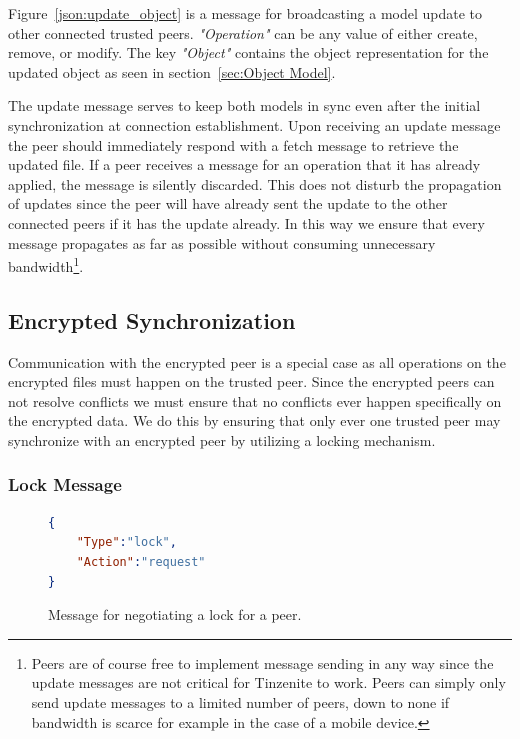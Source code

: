 Figure~\ref{json:update_object} is a message for broadcasting a model update to other connected trusted peers.
\textit{"Operation"} can be any value of either create, remove, or modify.
The key \textit{"Object"} contains the object representation for the updated object as seen in section~\ref{sec:Object Model}.

The update message serves to keep both models in sync even after the initial synchronization at connection establishment.
Upon receiving an update message the peer should immediately respond with a fetch message to retrieve the updated file.
If a peer receives a message for an operation that it has already applied, the message is silently discarded.
This does not disturb the propagation of updates since the peer will have already sent the update to the other connected peers if it has the update already.
In this way we ensure that every message propagates as far as possible without consuming unnecessary bandwidth\footnote{Peers are of course free to implement message sending in any way since the update messages are not critical for Tinzenite to work. Peers can simply only send update messages to a limited number of peers, down to none if bandwidth is scarce for example in the case of a mobile device.}.

\subsection{Encrypted Synchronization}
\label{sub:Encrypted Synchronization}

Communication with the encrypted peer is a special case as all operations on the encrypted files must happen on the trusted peer.
Since the encrypted peers can not resolve conflicts we must ensure that no conflicts ever happen specifically on the encrypted data.
We do this by ensuring that only ever one trusted peer may synchronize with an encrypted peer by utilizing a locking mechanism.

\subsubsection{Lock Message}
\label{subs:Lock Message}

\begin{figure}[htp]
    \begin{lstlisting}[language=json,firstnumber=0]
{
    "Type":"lock",
    "Action":"request"
}
    \end{lstlisting}
\caption[Lock Peer Message]{Message for negotiating a lock for a peer.}
\label{json:lock_peer}
\end{figure}


